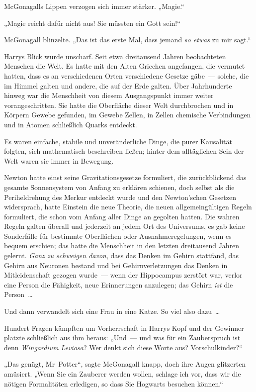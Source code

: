 {McGonagalls Lippen verzogen sich immer stärker. „Magie.“

„Magie reicht dafür nicht aus! Sie müssten ein Gott sein!“

McGonagall blinzelte. „Das ist das erste Mal, dass jemand \emph{so etwas} zu mir sagt.“

Harrys Blick wurde unscharf. Seit etwa dreitausend Jahren beobachteten Menschen die Welt. Es hatte mit den Alten Griechen angefangen, die vermutet hatten, dass es an verschiedenen Orten verschiedene Gesetze gäbe~— solche, die im Himmel galten und andere, die auf der Erde galten. Über Jahrhunderte hinweg war die Menschheit von diesem Ausgangspunkt immer weiter vorangeschritten. Sie hatte die Oberfläche dieser Welt durchbrochen und in Körpern Gewebe gefunden, im Gewebe Zellen, in Zellen chemische Verbindungen und in Atomen schließlich Quarks entdeckt.

Es waren einfache, stabile und unveränderliche Dinge, die purer Kausalität folgten, sich mathematisch beschreiben ließen; hinter dem alltäglichen Sein der Welt waren sie immer in Bewegung.

Newton hatte einst seine Gravitationsgesetze formuliert, die zurückblickend das gesamte Sonnensystem von Anfang zu erklären schienen, doch selbst als die Periheldrehung des Merkur entdeckt wurde und den Newton'schen Gesetzen widersprach, hatte Einstein die neue Theorie, die neuen allgemeingültigen Regeln formuliert, die schon vom Anfang aller Dinge an gegolten hatten. Die wahren Regeln galten überall und jederzeit an jedem Ort des Universums, es gab keine Sonderfälle für bestimmte Oberflächen oder Ausnahmeregelungen, wenn es bequem erschien; das hatte die Menschheit in den letzten dreitausend Jahren gelernt. \emph{Ganz zu schweigen davon}, dass das Denken im Gehirn stattfand, das Gehirn aus Neuronen bestand und bei Gehirnverletzungen das Denken in Mitleidenschaft gezogen wurde~— wenn der Hippocampus zerstört war, verlor eine Person die Fähigkeit, neue Erinnerungen anzulegen; das Gehirn \emph{ist} die Person~…

Und dann verwandelt sich eine Frau in eine Katze. So viel also dazu~…

Hundert Fragen kämpften um Vorherrschaft in Harrys Kopf und der Gewinner platzte schließlich aus ihm heraus: „Und~— und was für ein Zauberspruch ist denn \emph{Wingardium Leviosa}? Wer denkt sich diese Worte aus? Vorschulkinder?“

„Das genügt, Mr~Potter“, sagte McGonagall knapp, doch ihre Augen glitzerten amüsiert. „Wenn Sie ein Zauberer werden wollen, schlage ich vor, dass wir die nötigen Formalitäten erledigen, so dass Sie Hogwarts besuchen können.“

}
